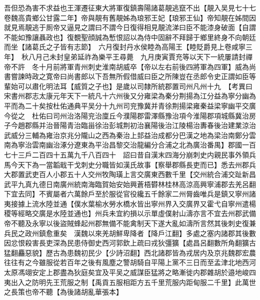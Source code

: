 吾但恐為害不求益也王渾遷征東大將軍復鎮壽陽諸葛靚逃竄不出【靚入吴見七十七卷魏高貴鄉公甘露二年】帝與靚有舊靚姊為琅邪王妃【琅邪王仙】帝知靚在姊間因就見焉靚逃于厠帝又逼見之謂曰不謂今日復得相見靚流涕曰臣不能漆身破面【自謂不能如豫讓聶政也】復覩聖顔誠為慙恨詔以為侍中固辭不拜歸于鄉里終身不向朝廷而坐【諸葛氏之子皆有志節】　六月復封丹水侯睦為高陽王【睦貶爵見上卷咸寧三年】　秋八月己未封皇弟延祚為樂平王尋薨　九月庚寅賈充等以天下一統屢請封禪帝不許　冬十月前將軍青州刺史淮南胡威卒【帝以左右前後四將軍為四軍】威為尚書嘗諫時政之寛帝曰尚書郎以下吾無所假借威曰臣之所陳豈在丞郎令史正謂如臣等輩始可以肅化明法耳【威質之子也】是歲以司隸所統郡置司州凡州十九　【考異曰宋書州郡志太康元年天下一統凡十六州後又分雍梁為秦分荆揚為江分益為寧分幽為平而為二十矣按杜佑通典平吴分十九州司兖豫冀并青徐荆揚梁雍秦益梁寧幽平交廣今從之　杜佑曰司州治洛陽兖治廩丘今濮陽郡雷澤縣豫治項今淮陽郡項城縣冀治房子今趙郡縣并治晉陽青治臨甾徐治彭城荆初治襄陽後治江陵楊治夀春後治建業涼治武威分三輔為雍治京兆分隴山之西為秦治上邽益治成都分巴漢之地為梁治南鄭分雲南為寧治雲南幽治涿分遼東為平治昌黎交治龍編分合浦之北為廣治番禺】郡國一百七十三戶二百四十五萬九千八百四十　詔曰昔自漢末四海分崩刺史内親民事外領兵馬今天下為一當韜戢干戈刺史分職皆如漢氏故事【察舉郡縣長吏而已】悉去州郡兵大郡置武吏百人小郡五十人交州牧陶璜上言交廣東西數千里【交州統合浦交趾新昌武平九真九德日南廣州統南海臨賀始安始興蒼梧欎林桂林高涼高興寧浦郡去羌呂翻下宜去同】不賓屬者六萬餘戶至於服從官役纔五千餘家二州脣齒唯兵是鎮又寧州諸夷接據上流水陸並通【僕水葉榆水勞水橋水皆出寧州界入交廣界又霍弋自寧州遣楊稷等經略交廣是水陸並通也】州兵未宜約損以示單虛僕射山濤亦言不宜去州郡武備帝不聽及永寧以後盜賊蜂起州郡無備不能禽制天下遂大亂如濤所言然其後刺史復兼兵民之政州鎮愈重矣　漢魏以來羌胡鮮卑降者【降戶江翻】多處之塞内諸郡其後數因忿恨殺害長吏深為民患侍御史西河郭欽上疏曰戎狄彊獷【處昌呂翻數所角翻獷古猛翻麤惡貌】歷古為患魏初民少【少詩沼翻】西北諸郡皆為戎居内及京兆魏郡宏農往往有之今雖服從若百年之後有風塵之警胡騎自平陽上黨不三日而至孟津北地西河太原馮翊安定上郡盡為狄庭矣宜及平吴之威謀臣猛將之略漸徙内郡雜胡於邉地峻四夷出入之防明先王荒服之制【禹貢五服相距方五千里荒服内距甸服二千里】此萬世之長策也帝不聽【為後諸胡亂華張本】

